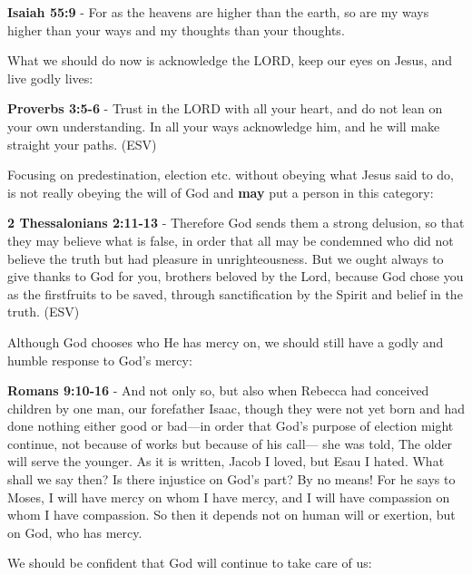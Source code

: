 \documentclass[11pt]{article}
\begin{document}
\textbf{Isaiah 55:9} - For as the heavens are higher than the earth, so are my ways higher than your ways and my thoughts than your thoughts.

What we should do now is acknowledge the LORD, keep our eyes on Jesus, and live godly lives:

\textbf{Proverbs 3:5-6} - Trust in the LORD with all your heart, and do not lean on your own understanding. In all your ways acknowledge him, and he will make straight your paths. (ESV)

Focusing on predestination, election etc. without obeying what Jesus said to do, is not really obeying the will of God and \textbf{may} put a person in this category:

\textbf{2 Thessalonians 2:11-13} - Therefore God sends them a strong delusion, so that they may believe what is false, in order that all may be condemned who did not believe the truth but had pleasure in unrighteousness.  But we ought always to give thanks to God for you, brothers beloved by the Lord, because God chose you as the firstfruits to be saved, through sanctification by the Spirit and belief in the truth.  (ESV)

Although God chooses who He has mercy on, we should still have a godly and humble response to God's mercy:

\textbf{Romans 9:10-16} - And not only so, but also when Rebecca had conceived children by one man, our forefather Isaac, though they were not yet born and had done nothing either good or bad—in order that God's purpose of election might continue, not because of works but because of his call— she was told, The older will serve the younger. As it is written, Jacob I loved, but Esau I hated. What shall we say then? Is there injustice on God's part? By no means! For he says to Moses, I will have mercy on whom I have mercy, and I will have compassion on whom I have compassion. So then it depends not on human will or exertion, but on God, who has mercy.

We should be confident that God will continue to take care of us:
\end{document}
